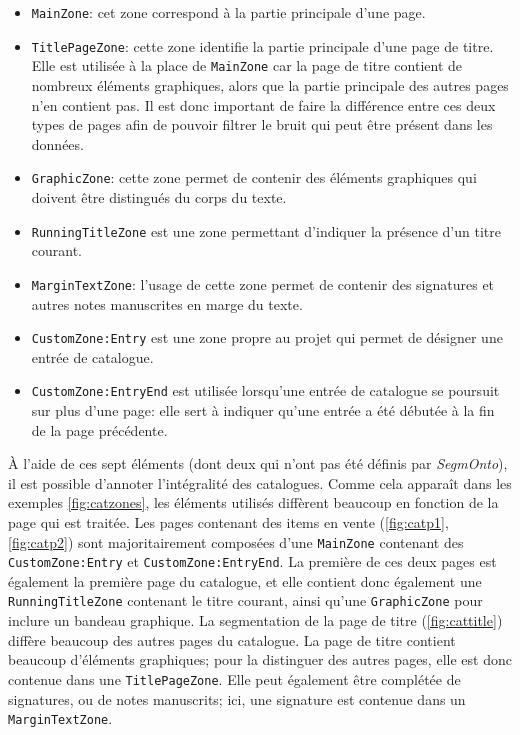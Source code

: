 \begin{itemize}
	\item \texttt{MainZone}: cet zone correspond à la partie principale d'une page.
	\item \texttt{TitlePageZone}: cette zone identifie la partie principale d'une page de titre. Elle est utilisée à la place de \texttt{MainZone} car la page de titre contient de nombreux éléments graphiques, alors que la partie principale des autres pages n'en contient pas. Il est donc important de faire la différence entre ces deux types de pages afin de pouvoir filtrer le bruit qui peut être présent dans les données.
	\item \texttt{GraphicZone}: cette zone permet de contenir des éléments graphiques qui doivent être distingués du corps du texte.
	\item \texttt{RunningTitleZone} est une zone permettant d'indiquer la présence d'un titre courant.
	\item \texttt{MarginTextZone}: l'usage de cette zone permet de contenir des signatures et autres notes manuscrites en marge du texte.
	\item \texttt{CustomZone:Entry} est une zone propre au projet \mssktb{} qui permet de désigner une entrée de catalogue.
	\item \texttt{CustomZone:EntryEnd} est utilisée lorsqu'une entrée de catalogue se poursuit sur plus d'une page: elle sert à indiquer qu'une entrée a été débutée à la fin de la page précédente.
\end{itemize}

À l'aide de ces sept éléments (dont deux qui n'ont pas été définis par \textit{SegmOnto}), il est possible d'annoter l'intégralité des catalogues. Comme cela apparaît dans les exemples \ref{fig:catzones}, les éléments utilisés diffèrent beaucoup en fonction de la page qui est traitée. Les pages contenant des items en vente (\ref{fig:catp1}, \ref{fig:catp2}) sont majoritairement composées d'une \texttt{MainZone} contenant des \texttt{CustomZone:Entry} et \texttt{CustomZone:EntryEnd}. La première de ces deux pages est également la première page du catalogue, et elle contient donc également une \texttt{RunningTitleZone} contenant le titre courant, ainsi qu'une \texttt{GraphicZone} pour inclure un bandeau graphique. La segmentation de la page de titre (\ref{fig:cattitle}) diffère beaucoup des autres pages du catalogue. La page de titre contient beaucoup d'éléments graphiques; pour la distinguer des autres pages, elle est donc contenue dans une \texttt{TitlePageZone}. Elle peut également être complétée de signatures, ou de notes manuscrits; ici, une signature est contenue dans un \texttt{MarginTextZone}.


